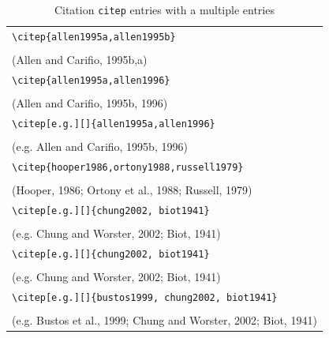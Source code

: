 ﻿\documentclass{article}
\begin{document}
\begin{table}
\begin{center}
\begin{tabular}{l}
    \verb#\citep{allen1995a,allen1995b}# \\
    \citep{allen1995a,allen1995b} \\
    (Allen and Carifio, 1995b,a) \\
\hline
    \verb#\citep{allen1995a,allen1996}# \\
    \citep{allen1995a,allen1996} \\
    (Allen and Carifio, 1995b, 1996) \\
\hline
    \verb#\citep[e.g.][]{allen1995a,allen1996}# \\
    \citep[e.g.][]{allen1995a,allen1996} \\
    (e.g. Allen and Carifio, 1995b, 1996) \\
\hline
    \verb#\citep{hooper1986,ortony1988,russell1979}# \\
    \citep{hooper1986,ortony1988,russell1979}  \\
    (Hooper, 1986; Ortony et al., 1988; Russell, 1979)\\
 \hline
    \verb#\citep[e.g.][]{chung2002, biot1941}#\\
    \citep[e.g.][]{chung2002, biot1941} \\
    (e.g. Chung and Worster, 2002; Biot, 1941)\\
 \hline
    \verb#\citep[e.g.][]{chung2002, biot1941}#\\
    \citep[e.g.][]{chung2002, biot1941} \\
    (e.g. Chung and Worster, 2002; Biot, 1941)\\
 \hline
    \verb#\citep[e.g.][]{bustos1999, chung2002, biot1941}#\\
    \citep[e.g.][]{bustos1999, chung2002, biot1941} \\
    (e.g. Bustos et al., 1999; Chung and Worster, 2002; Biot, 1941)\\
\end{tabular}
\end{center}
\caption{Citation \texttt{citep} entries with a multiple entries}
\end{table}
\end{document}
